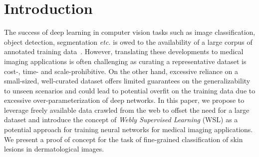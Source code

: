 \documentclass{llncs}
\begin{document}
\section{Introduction}



The success of deep learning in computer vision tasks such as image classification, object detection, segmentation \textit{etc.} is owed to the availability of a large corpus of annotated training data~\cite{resnet,inceptionv3,inceptionv4}. However, translating these developments to medical imaging applications is often challenging as curating a representative dataset is cost-, time- and scale-prohibitive. On the other hand, excessive reliance on a small-sized, well-curated dataset offers limited guarantees on the generalizability to unseen scenarios and could lead to potential overfit on the training data due to excessive over-parameterization of deep networks. In this paper, we propose to leverage freely available data crawled from the web to offset the need for a large dataset and introduce the concept of \textit{Webly Supervised Learning} (WSL) as a potential approach for training neural networks for medical imaging applications. We present a proof of concept for the task of fine-grained classification of skin lesions in dermatological images. 
\end{document}
